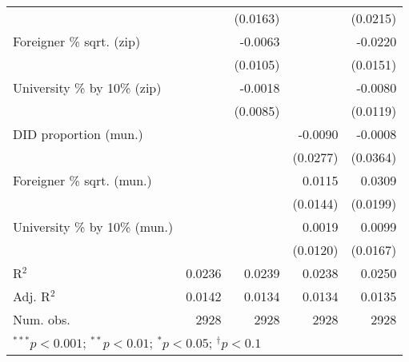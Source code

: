 \begin{tabular}{l D{.}{.}{4.7} D{.}{.}{4.7} D{.}{.}{4.7} D{.}{.}{4.7}}
                                  &               & (0.0163)      &               & (0.0215)      \\
Foreigner \% sqrt. (zip)          &               & -0.0063       &               & -0.0220       \\
                                  &               & (0.0105)      &               & (0.0151)      \\
University \% by 10\% (zip)       &               & -0.0018       &               & -0.0080       \\
                                  &               & (0.0085)      &               & (0.0119)      \\
DID proportion (mun.)             &               &               & -0.0090       & -0.0008       \\
                                  &               &               & (0.0277)      & (0.0364)      \\
Foreigner \% sqrt. (mun.)         &               &               & 0.0115        & 0.0309        \\
                                  &               &               & (0.0144)      & (0.0199)      \\
University \% by 10\% (mun.)      &               &               & 0.0019        & 0.0099        \\
                                  &               &               & (0.0120)      & (0.0167)      \\
\midrule
R$^2$                             & 0.0236        & 0.0239        & 0.0238        & 0.0250        \\
Adj. R$^2$                        & 0.0142        & 0.0134        & 0.0134        & 0.0135        \\
Num. obs.                         & 2928          & 2928          & 2928          & 2928          \\
\bottomrule
{}
\end{tabular}
